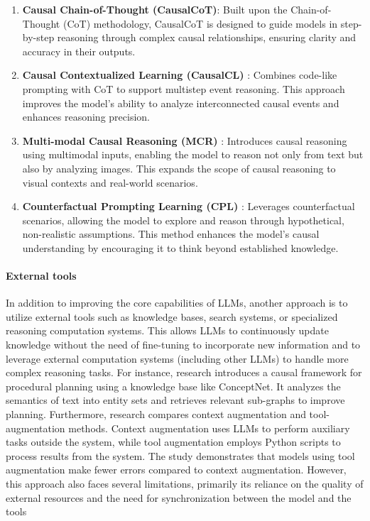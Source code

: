 \begin{enumerate}
    \item \textbf{Causal Chain-of-Thought (CausalCoT)}: Built upon the Chain-of-Thought (CoT) methodology, CausalCoT \cite{jin2023cladder} is designed to guide models in step-by-step reasoning through complex causal relationships, ensuring clarity and accuracy in their outputs.
    \item \textbf{Causal Contextualized Learning (CausalCL)} \cite{wang2023contextualized}: Combines code-like prompting with CoT to support multistep event reasoning. This approach improves the model's ability to analyze interconnected causal events and enhances reasoning precision.
    \item \textbf{Multi-modal Causal Reasoning (MCR)} \cite{zang2023discovering}: Introduces causal reasoning using multimodal inputs, enabling the model to reason not only from text but also by analyzing images. This expands the scope of causal reasoning to visual contexts and real-world scenarios.
    \item \textbf{Counterfactual Prompting Learning (CPL)} \cite{he2022cpl}: Leverages counterfactual scenarios, allowing the model to explore and reason through hypothetical, non-realistic assumptions. This method enhances the model's causal understanding by encouraging it to think beyond established knowledge.
\end{enumerate}

\paragraph{External tools} In addition to improving the core capabilities of LLMs, another approach is to utilize external tools such as knowledge bases, search systems, or specialized reasoning computation systems. This allows LLMs to continuously update knowledge without the need of fine-tuning to incorporate new information
and to leverage external computation systems (including other LLMs) to handle more complex reasoning tasks.
For instance, research \cite{lu2022neuro} introduces a causal framework for procedural planning using a knowledge base like ConceptNet. It analyzes the semantics of text into entity sets and retrieves relevant sub-graphs to improve planning. 
Furthermore, research \cite{pawlowski2023answering} compares context augmentation and tool-augmentation methods. Context augmentation uses LLMs to perform auxiliary tasks outside the system, while tool augmentation employs Python scripts to process results from the system. 
The study demonstrates that models using tool augmentation make fewer errors compared to context augmentation.
However, this approach also faces several limitations, primarily its reliance on the quality of external resources and the need for synchronization between the model and the tools


